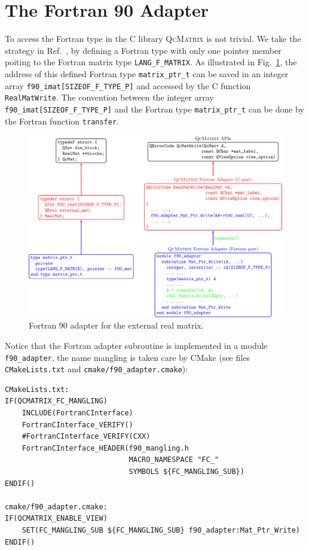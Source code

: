 \documentclass[a4paper,11pt,twoside,openright]{book}
\begin{document}
\section{The Fortran 90 Adapter}
\label{section-F90-adapter}

To access the Fortran type in the C library \textsc{QcMatrix} is not trivial.
We take the strategy in Ref.~\cite{Pletzer-CSE-10-86}, by defining a Fortran
type with only one pointer member poiting to the Fortran matrix type \verb|LANG_F_MATRIX|.
As illustrated in Fig.~\ref{fig-F90-adapter-type}, the address of this defined
Fortran type \verb|matrix_ptr_t| can be saved in an integer array
\verb|f90_imat[SIZEOF_F_TYPE_P]| and accessed by the C function \verb|RealMatWrite|.
The convention between the integer array \verb|f90_imat[SIZEOF_F_TYPE_P]| and
the Fortran type \verb|matrix_ptr_t| can be done by the Fortran function
\verb|transfer|.
\begin{figure}[hbtp]
  \centering
  \includegraphics[width=17cm]{F90_adapter_type.pdf}
  \caption{Fortran 90 adapter for the external real matrix.}
  \label{fig-F90-adapter-type}
\end{figure}

Notice that the Fortran adapter subroutine is implemented in a module
\verb|f90_adapter|, the name mangling is taken care by CMake (see files
\verb|CMakeLists.txt| and \verb|cmake/f90_adapter.cmake|):
\begin{verbatim}
CMakeLists.txt:
IF(QCMATRIX_FC_MANGLING)
    INCLUDE(FortranCInterface)
    FortranCInterface_VERIFY()
    #FortranCInterface_VERIFY(CXX)
    FortranCInterface_HEADER(f90_mangling.h
                             MACRO_NAMESPACE "FC_"
                             SYMBOLS ${FC_MANGLING_SUB})
ENDIF()

cmake/f90_adapter.cmake:
IF(QCMATRIX_ENABLE_VIEW)
    SET(FC_MANGLING_SUB ${FC_MANGLING_SUB} f90_adapter:Mat_Ptr_Write)
ENDIF()
\end{verbatim}
\end{document}
